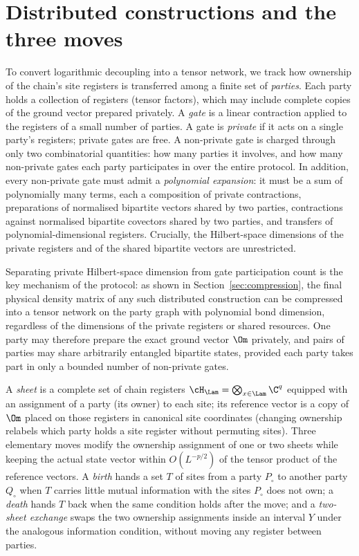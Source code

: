 \section{Distributed constructions and the three moves}\label{sec:moves}

\begin{inwords}
To convert logarithmic decoupling into a tensor network, we track how
ownership of the chain's site registers is transferred among a finite set of
\emph{parties}. Each party holds a collection of registers (tensor factors),
which may include complete copies of the ground vector prepared privately. A
\emph{gate} is a linear contraction applied to the registers of a small
number of parties. A gate is \emph{private} if it acts on a single party's
registers; private gates are free. A non-private gate is charged through
only two combinatorial quantities: how many parties it involves, and how
many non-private gates each party participates in over the entire protocol.
In addition, every non-private gate must admit a \emph{polynomial
expansion}: it must be a sum of polynomially many terms, each a composition
of private contractions, preparations of normalised bipartite vectors shared
by two parties, contractions against normalised bipartite covectors shared by
two parties, and transfers of polynomial-dimensional registers. Crucially,
the Hilbert-space dimensions of the private registers and of the shared
bipartite vectors are unrestricted.

Separating private Hilbert-space dimension from gate participation count is
the key mechanism of the protocol: as shown in Section~\ref{sec:compression},
the final physical density matrix of any such distributed construction can be
compressed into a tensor network on the party graph with polynomial bond
dimension, regardless of the dimensions of the private registers or shared
resources. One party may therefore prepare the exact ground vector $\Om$
privately, and pairs of parties may share arbitrarily entangled bipartite
states, provided each party takes part in only a bounded number of
non-private gates.

A \emph{sheet} is a complete set of chain registers
$\cH_\Lam=\bigotimes_{x\in\Lam}\C^q$ equipped with an assignment of a party
(its owner) to each site; its reference vector is a copy of $\Om$ placed on
those registers in canonical site coordinates (changing ownership relabels
which party holds a site register without permuting sites). Three elementary
moves modify the ownership assignment of one or two sheets while keeping the
actual state vector within $O(L^{-p/2})$ of the tensor product of the
reference vectors. A \emph{birth} hands a set $T$ of sites from a party
$P_\circ$ to another party $Q_\circ$ when $T$ carries little mutual
information with the sites $P_\circ$ does not own; a \emph{death} hands $T$
back when the same condition holds after the move; and a \emph{two-sheet
exchange} swaps the two ownership assignments inside an interval $Y$ under
the analogous information condition, without moving any register between
parties.
\end{inwords}

